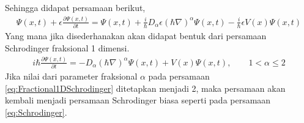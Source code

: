 Sehingga didapat persamaan berikut,
\begin{align}
    \Psi(x,t) + \epsilon\frac{\partial \Psi(x,t)}{\partial t} = \Psi(x,t) + \frac{i}{\hbar}D_\alpha \epsilon (\hbar\nabla)^\alpha \Psi(x,t) - \frac{i}{\hbar}\epsilon V(x)\Psi(x,t)
\end{align}
Yang mana jika disederhanakan akan didapat bentuk dari persamaan Schrodinger fraksional 1 dimensi. 
\begin{align}
    i\hbar \frac{\partial\Psi(x,t)}{\partial t} = -D_\alpha(\hbar\nabla)^\alpha \Psi(x,t) + V(x)\Psi(x,t), \qquad 1<\alpha\leq 2 \label{eq:Fractional1DSchrodinger}
\end{align}
Jika nilai dari parameter fraksional \(\alpha\) pada persamaan \ref{eq:Fractional1DSchrodinger} ditetapkan menjadi 2, maka persamaan akan kembali menjadi persamaan Schrodinger biasa seperti pada persamaan \ref{eq:Schrodinger}. \cite{Laskin2018Fractional}

